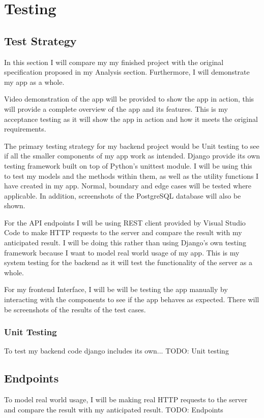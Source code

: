 \chapter{Testing}

\section{Test Strategy}
In this section I will compare my my finished project with the original specification proposed in my Analysis section. Furthermore, I will demonstrate my app as a whole.

Video demonstration of the app will be provided to show the app in action, this will provide a complete overview of the app and its features. This is my acceptance testing as it will show the app in action and how it meets the original requirements.

The primary testing strategy for my backend project would be Unit testing to see if all the smaller components of my app work as intended. Django provide its own testing framework built on top of Python's unittest module. I will be using this to test my models and the methods within them, as well as the utility functions I have created in my app. Normal, boundary and edge cases will be tested where applicable. In addition, screenshots of the PostgreSQL database will also be shown.

For the API endpoints I will be using REST client provided by Visual Studio Code to make HTTP requests to the server and compare the result with my anticipated result. I will be doing this rather than using Django's own testing framework because I want to model real world usage of my app. This is my system testing for the backend as it will test the functionality of the server as a whole.

For my frontend Interface, I will be will be testing the app manually by interacting with the components to see if the app behaves as expected. There will be screenshots of the results of the test cases. 



\subsection{Unit Testing}
To test my backend code django includes its own...
TODO: Unit testing

\section{Endpoints}
To model real world usage, I will be making real HTTP requests to the server and compare the result with my anticipated result.
TODO: Endpoints


